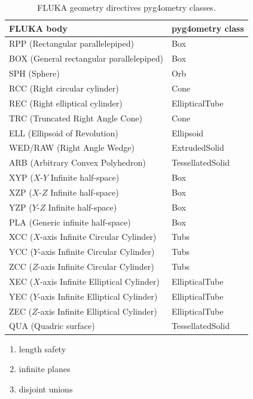 \documentclass[final,5p,times,twocolumn]{elsarticle}
\begin{document}
\begin{table}[hbt!]
\centering
\begin{tabular}{|l|l|} \hline
FLUKA body							& pyg4ometry class 		\\ \hline
RPP 	(Rectangular parallelepiped)			& Box				\\
BOX	(General rectangular parallelepiped)		& Box				\\
SPH 	(Sphere)							& Orb				\\
RCC (Right circular cylinder)				& Cone				\\
REC (Right elliptical cylinder)				& EllipticalTube			\\
TRC (Truncated Right Angle Cone)			& Cone				\\
ELL (Ellipsoid of Revolution) 				& Ellipsoid				\\
WED/RAW (Right Angle Wedge)			& ExtrudedSolid		\\
ARB	(Arbitrary Convex Polyhedron)			& TessellatedSolid		\\
XYP 	($X$-$Y$ Infinite half-space)			& Box				\\
XZP 	($X$-$Z$ Infinite half-space)			& Box				\\
YZP 	($Y$-$Z$ Infinite half-space)			& Box				\\
PLA (Generic infinite half-space)			& Box				\\
XCC ($X$-axis Infinite Circular Cylinder)		& Tubs				\\
YCC ($Y$-axis Infinite Circular Cylinder)		& Tubs				\\
ZCC 	($Z$-axis Infinite Circular Cylinder)		& Tubs				\\
XEC 	($X$-axis Infinite Elliptical Cylinder)		& EllipticalTube			\\
YEC 	($Y$-axis Infinite Elliptical Cylinder)		& EllipticalTube			\\
ZEC ($Z$-axis Infinite Elliptical Cylinder)		& EllipticalTube			\\
QUA (Quadric surface) 					& TessellatedSolid		\\ \hline
\end{tabular}
\caption{FLUKA geometry directives pyg4ometry classes.} \label{tab:Fluka2Geant4}
\end{table}

\begin{enumerate} 
\item length safety
\item infinite planes
\item disjoint unions 
\end{enumerate} 
\end{document}

